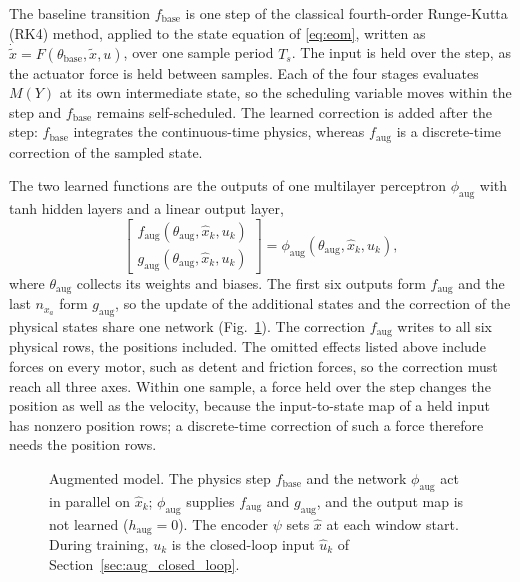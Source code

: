 The baseline transition $f_{\mathrm{base}}$ is one step of the classical
fourth-order Runge-Kutta (RK4) method, applied to the state equation of
\eqref{eq:eom}, written as $\dot{\tilde x}=F(\theta_{\mathrm{base}},\tilde
x,u)$, over one sample period $T_s$.
The input is held over the step, as the actuator force is held between
samples.
Each of the four stages evaluates $M(Y)$ at its own intermediate state, so
the scheduling variable moves within the step and $f_{\mathrm{base}}$
remains self-scheduled.
The learned correction is added after the step: $f_{\mathrm{base}}$
integrates the continuous-time physics, whereas $f_{\mathrm{aug}}$ is a
discrete-time correction of the sampled state.

The two learned functions are the outputs of one multilayer perceptron
$\phi_{\mathrm{aug}}$ with tanh hidden layers and a linear output layer,
\begin{equation}
 \begin{bmatrix}
  f_{\mathrm{aug}}(\theta_{\mathrm{aug}},\hat x_k,u_k)\\
  g_{\mathrm{aug}}(\theta_{\mathrm{aug}},\hat x_k,u_k)
 \end{bmatrix}
 =\phi_{\mathrm{aug}}(\theta_{\mathrm{aug}},\hat x_k,u_k),
 \label{eq:aug_mlp}
\end{equation}
where $\theta_{\mathrm{aug}}$ collects its weights and biases.
The first six outputs form $f_{\mathrm{aug}}$ and the last $n_{x_a}$ form
$g_{\mathrm{aug}}$, so the update of the additional states and the
correction of the physical states share one network
(Fig.~\ref{fig:aug_structure}).
The correction $f_{\mathrm{aug}}$ writes to all six physical rows, the
positions included.
The omitted effects listed above include forces on every motor, such as
detent and friction forces, so the correction must reach all three axes.
Within one sample, a force held over the step changes the position as well
as the velocity, because the input-to-state map of a held input has nonzero
position rows; a discrete-time correction of such a force therefore needs
the position rows.

\begin{figure}[t]
 \centering
 \resizebox{\columnwidth}{!}{}
 \caption{Augmented model. The physics step $f_{\mathrm{base}}$ and the
 network $\phi_{\mathrm{aug}}$ act in parallel on $\hat x_k$;
 $\phi_{\mathrm{aug}}$ supplies $f_{\mathrm{aug}}$ and $g_{\mathrm{aug}}$,
 and the output map is not learned ($h_{\mathrm{aug}}=0$). The encoder
 $\psi$ sets $\hat x$ at each window start. During training, $u_k$ is the
 closed-loop input $\hat u_k$ of Section~\ref{sec:aug_closed_loop}.}
 \label{fig:aug_structure}
\end{figure}

